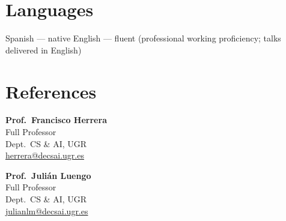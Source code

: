 \documentclass[10pt,a4paper]{article}
\newcommand{\sub}[1]{\textcolor{subtle}{\footnotesize #1}}
\begin{document}
\section*{Languages}

Spanish --- native \quad\textbar\quad English --- fluent (professional working proficiency; talks delivered in English)

\section*{References}

\begin{minipage}[t]{0.48\textwidth}
    \textbf{Prof.~Francisco Herrera} \\
    \sub{Full Professor \\ Dept.~CS \& AI, UGR \\ \href{mailto:herrera@decsai.ugr.es}{herrera@decsai.ugr.es}}
\end{minipage}\hfill
\begin{minipage}[t]{0.48\textwidth}
    \textbf{Prof.~Julián Luengo} \\
    \sub{Full Professor \\ Dept.~CS \& AI, UGR \\ \href{mailto:julianlm@decsai.ugr.es}{julianlm@decsai.ugr.es}}
\end{minipage}
\end{document}
